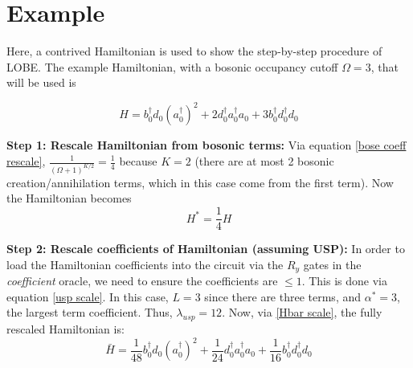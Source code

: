 \section{Example}
\label{subsec:example}
Here, a contrived Hamiltonian is used to show the step-by-step procedure of LOBE. The example Hamiltonian, with a bosonic occupancy cutoff $\Omega = 3$, that will be used is 

\begin{equation}
    H = b_0^\dagger d_0(a_0^\dagger)^2 + 2 d_0^\dagger a_0^\dagger a_0+3 b_0^\dagger d_0^\dagger d_0
\end{equation}

\textbf{Step 1: Rescale Hamiltonian from bosonic terms:}
Via equation \ref{bose coeff rescale}, $\frac{1}{(\Omega + 1)^{K/2}} = \frac{1}{4}$ because $K = 2$ (there are at most 2 bosonic creation/annihilation terms, which in this case come from the first term). Now the Hamiltonian becomes 
\begin{equation}
    H^* = \frac{1}{4}H
\end{equation}

\textbf{Step 2: Rescale coefficients of Hamiltonian (assuming USP):} In order to load the Hamiltonian coefficients into the circuit via the $R_y$ gates in the \textit{coefficient} oracle, we need to ensure the coefficients are $\leq 1$. This is done via equation \ref{usp scale}. 
In this case, $L = 3$ since there are three terms, and $\alpha^* = 3$, the largest term coefficient. Thus, $\lambda_{usp} = 12$. Now, via \ref{Hbar scale}, the fully rescaled Hamiltonian is:
\begin{equation}
    \bar{H} = \frac{1}{48}b_0^\dagger d_0(a_0^\dagger)^2 + \frac{1}{24} d_0^\dagger a_0^\dagger a_0+\frac{1}{16} b_0^\dagger d_0^\dagger d_0
\end{equation}

